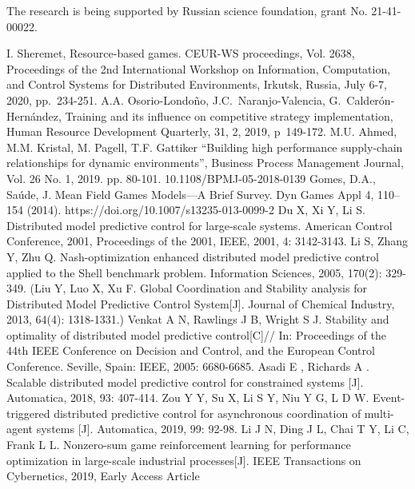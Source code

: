 \documentclass[conference]{IEEEtran}
\begin{document}
The research is being supported by Russian science foundation, grant No. 21-41-00022.

\begin{thebibliography}{999}

     I. Sheremet, Resource-based games. CEUR-WS proceedings, Vol. 2638, Proceedings of the 2nd International Workshop on Information, Computation, and Control Systems for Distributed Environments, Irkutsk, Russia, July 6-7, 2020, pp.~234-251.
     A.A. Osorio-Londoño, J.C.~Naranjo-Valencia, G.~Calderón-Hernández, Training and its influence on competitive strategy implementation, Human Resource Development Quarterly, 31, 2, 2019, p~149-172. 
    M.U. Ahmed, M.M. Kristal,  M. Pagell, T.F. Gattiker ``Building high performance supply-chain relationships for dynamic environments'', Business Process Management Journal, Vol. 26 No. 1, 2019. pp. 80-101. 10.1108/BPMJ-05-2018-0139
      Gomes, D.A., Saúde, J. Mean Field Games Models—A Brief Survey. Dyn Games Appl 4, 110–154 (2014). https://doi.org/10.1007/s13235-013-0099-2
     Du X, Xi Y, Li S. Distributed model predictive control for large-scale systems. American Control Conference, 2001, Proceedings of the 2001, IEEE, 2001, 4: 3142-3143.
     Li S, Zhang Y, Zhu Q. Nash-optimization enhanced distributed model predictive control applied to the Shell benchmark problem. Information Sciences, 2005, 170(2): 329-349.
     (Liu Y, Luo X, Xu F. Global Coordination and Stability analysis for 	Distributed Model Predictive Control System[J]. Journal of Chemical Industry, 2013, 64(4): 1318-1331.)
     Venkat A N, Rawlings J B, Wright S J. Stability and optimality of 	distributed model predictive control[C]// In: Proceedings of the 44th IEEE Conference on Decision and Control, and the European Control Conference. Seville, Spain: IEEE, 2005: 6680-6685.
     Asadi E , Richards A . Scalable distributed model predictive control for constrained systems [J]. Automatica, 2018, 93: 407-414.
     Zou Y Y, Su X, Li S Y, Niu Y G, L D W. Event-triggered distributed predictive control for asynchronous coordination of multi-agent systems [J]. Automatica, 2019, 99: 92-98.
     Li J N, Ding J L, Chai T Y, Li C, Frank L L. Nonzero-sum game reinforcement learning for performance optimization in large-scale industrial processes[J]. IEEE Transactions on Cybernetics, 2019, Early Access Article

\end{thebibliography}
\end{document}
